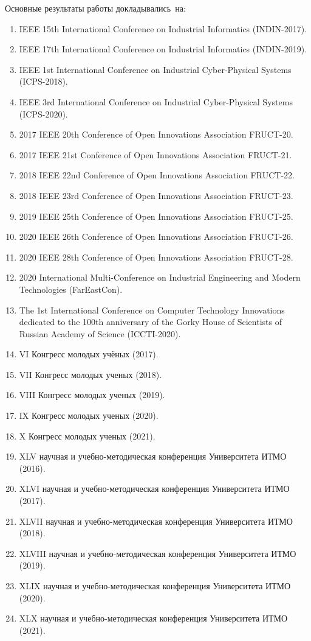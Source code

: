 {\probation}
Основные результаты работы докладывались~на:
\begin{enumerate}[beginpenalty=10000]
	\item IEEE 15th International Conference on Industrial Informatics (INDIN-2017).
	\item IEEE 17th International Conference on Industrial Informatics (INDIN-2019).
	\item IEEE 1st International Conference on Industrial Cyber-Physical Systems (ICPS-2018).
	\item IEEE 3rd International Conference on Industrial Cyber-Physical Systems (ICPS-2020).
	\item 2017 IEEE 20th Conference of Open Innovations Association {FRUCT-20}.
	\item 2017 IEEE 21st Conference of Open Innovations Association {FRUCT-21}.
	\item 2018 IEEE 22nd Conference of Open Innovations Association {FRUCT-22}.
	\item 2018 IEEE 23rd Conference of Open Innovations Association {FRUCT-23}.
	\item 2019 IEEE 25th Conference of Open Innovations Association {FRUCT-25}.
	\item 2020 IEEE 26th Conference of Open Innovations Association {FRUCT-26}.
	\item 2020 IEEE 28th Conference of Open Innovations Association {FRUCT-28}.
	\item 2020 International Multi-Conference on Industrial Engineering and Modern Technologies (FarEastCon).
	\item The 1st International Conference on Computer Technology Innovations dedicated to the 100th anniversary of the Gorky House of Scientists of Russian Academy of Science (ICCTI-2020).
	\item VI Конгресс молодых учёных (2017).
	\item VII Конгресс молодых ученых (2018).
	\item VIII Конгресс молодых ученых (2019).
	\item IX Конгресс молодых ученых (2020).
	\item X Конгресс молодых ученых (2021).
	\item XLV научная и учебно-методическая конференция Университета \mbox{ИТМО} (2016).
	\item XLVI научная и учебно-методическая конференция Университета \mbox{ИТМО} (2017).
	\item XLVII научная и учебно-методическая конференция Университета \mbox{ИТМО} (2018).
	\item XLVIII научная и учебно-методическая конференция Университета \mbox{ИТМО} (2019).
	\item XLIX научная и учебно-методическая конференция Университета \mbox{ИТМО} (2020).
	\item XLX научная и учебно-методическая конференция Университета \mbox{ИТМО} (2021).
\end{enumerate}

